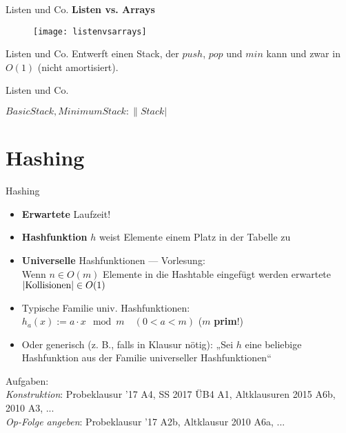 \begin{frame}{Listen und Co.}
	\textbf{Listen vs. Arrays}
	\begin{figure}[htp]
		\centering
		\texttt{[image: listenvsarrays]}
	\end{figure}
\end{frame}

\begin{frame}{Listen und Co.}
	\taskheading{}
	Entwerft einen Stack, der $push$, $pop$ und $min$ kann und zwar in $O(1)$ (nicht amortisiert).
\end{frame}

\begin{frame}{Listen und Co.}
	\solutionheading
	\begin{algorithm}[H]
		$BasicStack, MinimumStack: \|Stack|$ \;
		\;
		\;
		\;
	\end{algorithm}
\end{frame}


\section{Hashing}

\begin{frame}{Hashing}
	\begin{itemize}
		\item \textbf{Erwartete} Laufzeit!
		\item \textbf{Hashfunktion} $h$ weist Elemente einem Platz in der Tabelle zu 
		\item \textbf{Universelle} Hashfunktionen \quad --- \quad  Vorlesung: \\
		Wenn $n \in O(m)$ Elemente in die Hashtable eingefügt werden \impl erwartete $\left|\text{Kollisionen}\right| \in O(1)$ 
		\item Typische Familie univ. Hashfunktionen: \\
		$h_a(x) := a \cdot x \mod m \quad (0 < a < m)$ \quad ($m$ \textbf{prim}!)
		\item Oder generisch (z. B., falls in Klausur nötig): „Sei $h$ eine beliebige Hashfunktion aus der Familie universeller Hashfunktionen“
	\end{itemize}
	\bigskip
	\small Aufgaben: \\
	\hanging \emph{Konstruktion}: Probeklausur '17 A4, SS 2017 ÜB4 A1, Altklausuren 2015 A6b, 2010 A3, ... \\
	\emph{Op-Folge angeben}: Probeklausur '17 A2b, Altklausur 2010 A6a, ...
\end{frame}	

